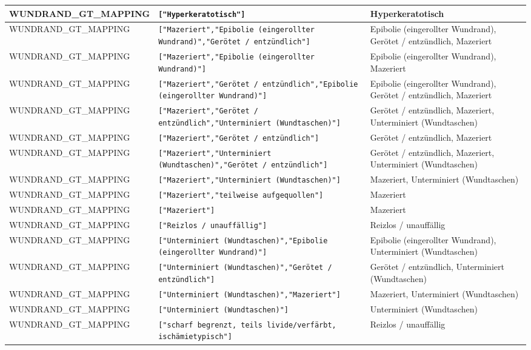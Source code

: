 \begin{longtable}{|p{3.5cm}|p{5cm}|p{6.5cm}|}
WUNDRAND\_GT\_MAPPING & \texttt{["Hyperkeratotisch"]} & Hyperkeratotisch \\ \hline
WUNDRAND\_GT\_MAPPING & \texttt{["Mazeriert","Epibolie (eingerollter Wundrand)","Gerötet / entzündlich"]} & Epibolie (eingerollter Wundrand), Gerötet / entzündlich, Mazeriert \\ \hline
WUNDRAND\_GT\_MAPPING & \texttt{["Mazeriert","Epibolie (eingerollter Wundrand)"]} & Epibolie (eingerollter Wundrand), Mazeriert \\ \hline
WUNDRAND\_GT\_MAPPING & \texttt{["Mazeriert","Gerötet / entzündlich","Epibolie (eingerollter Wundrand)"]} & Epibolie (eingerollter Wundrand), Gerötet / entzündlich, Mazeriert \\ \hline
WUNDRAND\_GT\_MAPPING & \texttt{["Mazeriert","Gerötet / entzündlich","Unterminiert (Wundtaschen)"]} & Gerötet / entzündlich, Mazeriert, Unterminiert (Wundtaschen) \\ \hline
WUNDRAND\_GT\_MAPPING & \texttt{["Mazeriert","Gerötet / entzündlich"]} & Gerötet / entzündlich, Mazeriert \\ \hline
WUNDRAND\_GT\_MAPPING & \texttt{["Mazeriert","Unterminiert (Wundtaschen)","Gerötet / entzündlich"]} & Gerötet / entzündlich, Mazeriert, Unterminiert (Wundtaschen) \\ \hline
WUNDRAND\_GT\_MAPPING & \texttt{["Mazeriert","Unterminiert (Wundtaschen)"]} & Mazeriert, Unterminiert (Wundtaschen) \\ \hline
WUNDRAND\_GT\_MAPPING & \texttt{["Mazeriert","teilweise aufgequollen"]} & Mazeriert \\ \hline
WUNDRAND\_GT\_MAPPING & \texttt{["Mazeriert"]} & Mazeriert \\ \hline
WUNDRAND\_GT\_MAPPING & \texttt{["Reizlos / unauffällig"]} & Reizlos / unauffällig \\ \hline
WUNDRAND\_GT\_MAPPING & \texttt{["Unterminiert (Wundtaschen)","Epibolie (eingerollter Wundrand)"]} & Epibolie (eingerollter Wundrand), Unterminiert (Wundtaschen) \\ \hline
WUNDRAND\_GT\_MAPPING & \texttt{["Unterminiert (Wundtaschen)","Gerötet / entzündlich"]} & Gerötet / entzündlich, Unterminiert (Wundtaschen) \\ \hline
WUNDRAND\_GT\_MAPPING & \texttt{["Unterminiert (Wundtaschen)","Mazeriert"]} & Mazeriert, Unterminiert (Wundtaschen) \\ \hline
WUNDRAND\_GT\_MAPPING & \texttt{["Unterminiert (Wundtaschen)"]} & Unterminiert (Wundtaschen) \\ \hline
WUNDRAND\_GT\_MAPPING & \texttt{["scharf begrenzt, teils livide/verfärbt, ischämietypisch"]} & Reizlos / unauffällig \\ \hline

\end{longtable}
